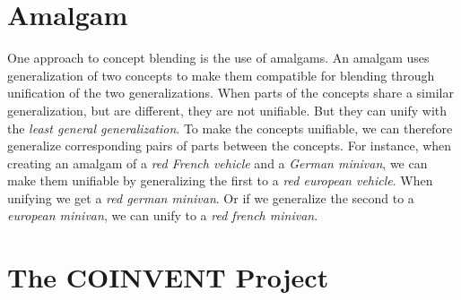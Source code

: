 \section{Amalgam}
One approach to concept blending is the use of amalgams. \parencite{Reference4}
An amalgam uses generalization of two concepts to make them compatible for blending through unification of the two generalizations. When parts of the concepts share a similar generalization, but are different, they are not unifiable. But they can unify with the \emph{least general generalization}. To make the concepts unifiable, we can therefore generalize corresponding pairs of parts between the concepts. For instance, when creating an amalgam of a \emph{red French vehicle} and a \emph{German minivan}, we can make them unifiable by generalizing the first to a \emph{red european vehicle}. When unifying we get a \emph{red german minivan}. Or if we generalize the second to a \emph{european minivan}, we can unify to a \emph{red french minivan}.



\section{The COINVENT Project}


